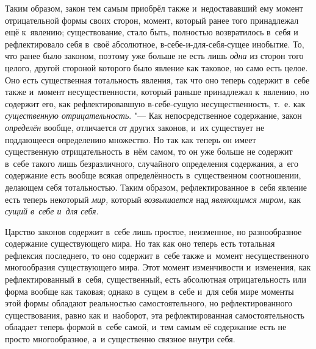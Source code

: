 Таким образом, закон тем самым приобрёл также и~недостававший ему момент
отрицательной формы своих сторон, момент, который ранее того принадлежал
ещё к~явлению; существование, стало быть, полностью возвратилось в~себя и
рефлектировало себя в~своё абсолютное, в-себе-и-для-себя-сущее инобытие.
То, что ранее было законом, поэтому уже больше не есть лишь
{\em одна} из сторон того целого, другой стороной
которого было явление как таковое, но само есть целое. Оно есть
существенная тотальность явления, так что оно теперь содержит в~себе также
и~момент несущественности, который раньше принадлежал к~явлению, но
содержит его, как рефлектировавшую в-себе-сущую несущественность, т.~е. как
{\em существенную отрицательность}. "--- Как
непосредственное содержание, закон {\em определён}
вообще, отличается от других законов, и~их существует не поддающееся
определению множество. Но так как теперь он имеет существенную
отрицательность в~нём самом, то он уже больше не содержит в~себе такого
лишь безразличного, случайного определения содержания, а~его содержание
есть вообще всякая определённость в~существенном соотношении, делающем себя
тотальностью. Таким образом, рефлектированное в~себя явление есть теперь
некоторый {\em мир,} который
{\em возвышается} над
{\em являющимся миром,} как
{\em сущий в~себе и~для себя}.

Царство законов содержит в~себе лишь простое, неизменное, но разнообразное
содержание существующего мира. Но так как оно теперь есть тотальная
рефлексия последнего, то оно содержит в~себе также и~момент несущественного
многообразия существующего мира. Этот момент изменчивости и~изменения, как
рефлектированный в~себя, существенный, есть абсолютная отрицательность или
форма вообще как таковая; однако в~сущем в~себе и~для себя мире моменты
этой формы обладают реальностью самостоятельного, но рефлектированного
существования, равно как и~наоборот, эта рефлектированная самостоятельность
обладает теперь формой в~себе самой, и~тем самым её содержание есть не
просто многообразное, а~и существенно связное внутри себя.


